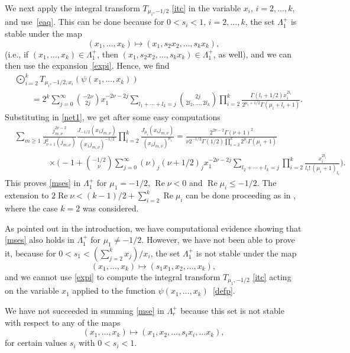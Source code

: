 \documentclass[12pt,leqno]{amsart}
\numberwithin{equation}{section}
\theoremstyle{plain}
\renewcommand{\Re}{\operatorname{Re}}
\begin{document}
We next apply the integral transform $T_{\mu_i,-1/2}$ \eqref{itc} in the variable $x_i$, $i=2,\dots, k$, and use~\eqref{eaq}. This can be done because for $0<s_i<1$, $i=2,\dots, k$, the set $\Lambda_{1}^+$ is stable under the map
\[
(x_1,\dots,x_k) \mapsto (x_1,s_2x_2,\dots, s_kx_k),
\]
(i.e., if $(x_1,\dots,x_k)\in \Lambda_{1}^+$, then $(x_1,s_2x_2,\dots, s_kx_k)\in \Lambda_{1}^+$, as well), and we can then use the expansion~\eqref{expi}.
Hence, we find
\begin{align*}
& \bigodot_{i=2}^k T_{\mu_i,-1/2,x_i} (\psi(x_1,\dots,x_k)) \\
&\qquad = 2^k \sum_{j=0}^\infty \binom{-2\nu}{2j}x_1^{-2\nu -2j} \sum_{l_1+\cdots+l_k=j}
\binom{2j}{2l_2,\dots,2l_k} \prod_{i=2}^k \frac{\Gamma(l_i+1/2)x_i^{2l_{i}}}{2^{\mu_i+1/2}\Gamma(\mu_i+l_i+1)}.
\end{align*}
Substituting in \eqref{net1}, we get after some easy computations
\begin{align*}
& \sum_{m\ge 1}\frac{j_{m,\nu}^{2\nu-2}}{J^2_{\nu+1}(j_{m,\nu})}
\frac{J_{-1/2}(x_1j_{m,\nu})}{(x_1j_{m,\nu})^{-1/2}} 
\prod_{i=2}^k \frac{J_{\mu_i}(x_ij_{m,\nu})}{(x_ij_{m,\nu})^{\mu_i}}
= \frac{2^{2\nu-2}\Gamma(\nu+1)^2}{\nu 2^{-1/2}\Gamma(1/2) \prod_{i=2}^k 2^{\mu_i}\Gamma(\mu_i+1) } \\%
&\qquad\qquad \times \Bigg( {-}1 +
\binom{-1/2}{\nu} \sum_{j=0}^\infty (\nu)_j(\nu+1/2)_jx_1^{-2\nu -2j} \sum_{l_2+\cdots+l_k=j}
 \prod_{i=2}^k \frac{x_i^{2l_{i}}}{l_i!\,(\mu_i+1)_{l_i}}\Bigg).
\end{align*}
This proves \eqref{mses} in $\Lambda_1^+$ for $\mu_1=-1/2$, $\Re \nu<0$ and $\Re \mu_i\le -1/2$.
The extension to $2\Re \nu<(k-1)/2+ \sum_{i=2}^k\Re \mu_i$ can be done proceeding as in \cite[Sect.~4.1]{DPVS}, where the case $k=2$ was considered.

As pointed out in the introduction, we have computational evidence showing that \eqref{mses} also holds in $\Lambda_1^+$ for $\mu_1\not =-1/2$. However, we have not been able to prove it, because for $0<s_1<( \sum_{j=2}^kx_j)/x_i$, the set $\Lambda_1^+$ is not stable under the map
\[
(x_1,\dots,x_k) \mapsto (s_1x_1,x_2,\dots, x_k),
\]
and we cannot use \eqref{expi} to compute the integral transform $T_{\mu_1,-1/2}$ \eqref{itc} acting on the variable $x_1$ applied to the function $\psi(x_1,\dots, x_k)$~\eqref{defp}.

We have not succeeded in summing \eqref{mse} in $\Lambda_{r}^+$ because this set
is not stable with respect to any of the maps
\[
(x_1,\dots,x_k) \mapsto (x_1,x_2,\dots,s_ix_i,\dots x_k),
\]
for certain values $s_i$ with $0<s_i<1$.
\end{document}
